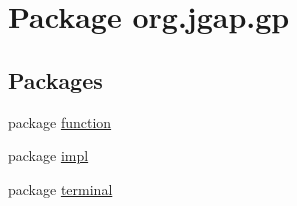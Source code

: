 \hypertarget{namespaceorg_1_1jgap_1_1gp}{\section{Package org.\-jgap.\-gp}
\label{namespaceorg_1_1jgap_1_1gp}
}
\subsection*{Packages}
\begin{DoxyCompactItemize}
\item 
package \hyperlink{namespaceorg_1_1jgap_1_1gp_1_1function}{function}
\item 
package \hyperlink{namespaceorg_1_1jgap_1_1gp_1_1impl}{impl}
\item 
package \hyperlink{namespaceorg_1_1jgap_1_1gp_1_1terminal}{terminal}
\end{DoxyCompactItemize}

